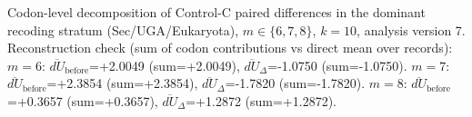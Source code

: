 Codon-level decomposition of Control-C paired differences in the dominant recoding stratum (Sec/UGA/Eukaryota), $m\in\{6,7,8\}$, $k=10$, analysis version 7.
Reconstruction check (sum of codon contributions vs direct mean over records):
$m=6$: $\overline{dU}_{\mathrm{before}}$=+2.0049 (sum=+2.0049), $\overline{dU}_{\Delta}$=-1.0750 (sum=-1.0750).
$m=7$: $\overline{dU}_{\mathrm{before}}$=+2.3854 (sum=+2.3854), $\overline{dU}_{\Delta}$=-1.7820 (sum=-1.7820).
$m=8$: $\overline{dU}_{\mathrm{before}}$=+0.3657 (sum=+0.3657), $\overline{dU}_{\Delta}$=+1.2872 (sum=+1.2872).
